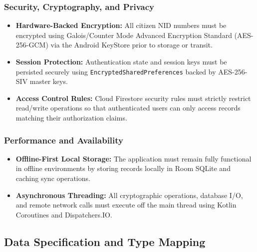 \documentclass[12pt,a4paper]{article}
\begin{document}
	\subsubsection{Security, Cryptography, and Privacy}
	\begin{itemize}
		\item \textbf{Hardware-Backed Encryption:} All citizen NID numbers must be encrypted using Galois/Counter Mode Advanced Encryption Standard (AES-256-GCM) via the Android KeyStore prior to storage or transit.
		\item \textbf{Session Protection:} Authentication state and session keys must be persisted securely using \texttt{EncryptedSharedPreferences} backed by AES-256-SIV master keys.
		\item \textbf{Access Control Rules:} Cloud Firestore security rules must strictly restrict read/write operations so that authenticated users can only access records matching their authorization claims.
	\end{itemize}
	
	\subsubsection{Performance and Availability}
	\begin{itemize}
		\item \textbf{Offline-First Local Storage:} The application must remain fully functional in offline environments by storing records locally in Room SQLite and caching sync operations.
		\item \textbf{Asynchronous Threading:} All cryptographic operations, database I/O, and remote network calls must execute off the main thread using Kotlin Coroutines and Dispatchers.IO.
	\end{itemize}
	
	\subsection{Data Specification and Type Mapping}
	
\end{document}
